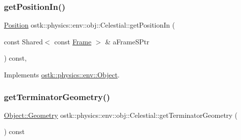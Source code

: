 \mbox{\label{classostk_1_1physics_1_1env_1_1obj_1_1_celestial_af38fd0017fe14cfb6103684fcb1d3ee9}} 
\subsubsection{\texorpdfstring{get\+Position\+In()}{getPositionIn()}}
{\footnotesize\ttfamily \hyperlink{classostk_1_1physics_1_1coord_1_1_position}{Position} ostk\+::physics\+::env\+::obj\+::\+Celestial\+::get\+Position\+In (\begin{DoxyParamCaption}\item[{const Shared$<$ const \hyperlink{classostk_1_1physics_1_1coord_1_1_frame}{Frame} $>$ \&}]{a\+Frame\+S\+Ptr }\end{DoxyParamCaption}) const\hspace{0.3cm}{\ttfamily [override]}, {\ttfamily [virtual]}}



Implements \hyperlink{classostk_1_1physics_1_1env_1_1_object_a990c33e0cc9e9421488f9fc4cbbf3f21}{ostk\+::physics\+::env\+::\+Object}.

\mbox{\label{classostk_1_1physics_1_1env_1_1obj_1_1_celestial_a4c594d934cf5c6a25795d6a992ea564f}} 
\subsubsection{\texorpdfstring{get\+Terminator\+Geometry()}{getTerminatorGeometry()}}
{\footnotesize\ttfamily \hyperlink{classostk_1_1physics_1_1env_1_1_object_a66e44a65aefb23a184a6de531e96935d}{Object\+::\+Geometry} ostk\+::physics\+::env\+::obj\+::\+Celestial\+::get\+Terminator\+Geometry (\begin{DoxyParamCaption}{ }\end{DoxyParamCaption}) const}

